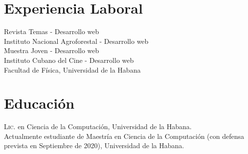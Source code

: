 \documentclass[11pt]{article} %
\begin{document}

\section*{Experiencia Laboral}

 Revista Temas - Desarrollo web \\
 Instituto Nacional Agroforestal - Desarrollo web \\
 Muestra Joven - Desarrollo web \\
 Instituto Cubano del Cine - Desarrollo web \\
 Facultad de F\'isica, Universidad de la Habana \\


\section*{Educaci\'on}

\textsc{Lic.} en Ciencia de la Computaci\'on, Universidad de la Habana.\\
\textsc{} Actualmente estudiante de Maestr\'ia en Ciencia de la Computaci\'on (con defensa prevista en Septiembre de 2020), Universidad de la Habana.\\




\end{document}
